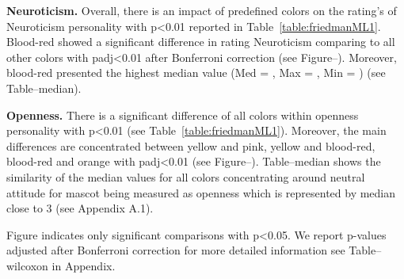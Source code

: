 \par \textbf{Neuroticism.}
Overall, there is an impact of predefined colors on the rating's of Neuroticism
personality with p<0.01 reported in Table~\ref{table:friedmanML1}.
Blood-red showed a significant difference in rating Neuroticism comparing
to all other colors with padj<0.01 after Bonferroni correction (see Figure--).
Moreover, blood-red presented the highest median value (Med = , Max = , Min = ) (see Table--median).

\par \textbf{Openness.}
There is a significant difference of all colors within openness personality
with p<0.01 (see Table~\ref{table:friedmanML1}).
Moreover, the main differences are concentrated between yellow and pink, yellow and blood-red,
blood-red and orange with padj<0.01 (see Figure--).
Table--median shows the similarity of the median values for all colors concentrating around neutral attitude for mascot
being measured as openness which is represented by median close to 3 (see Appendix A.1).

Figure indicates only significant comparisons with p<0.05.
We report p-values adjusted after Bonferroni correction for more
detailed information see Table--wilcoxon in Appendix.

